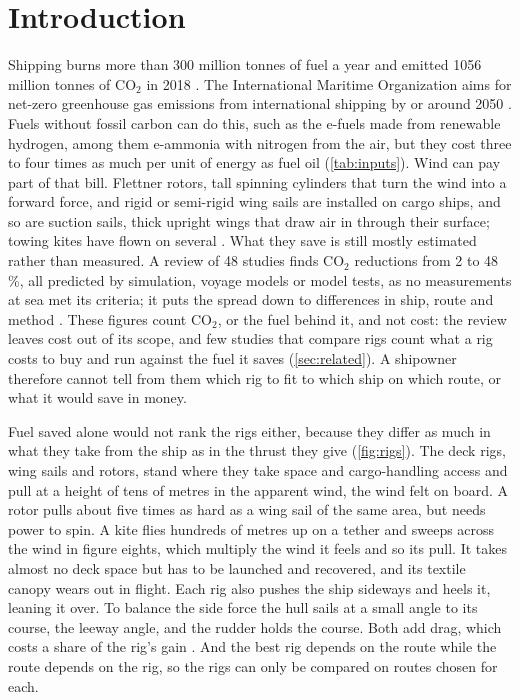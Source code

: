 \section{Introduction}
\label{sec:introduction}

Shipping burns more than 300 million tonnes of fuel a year and emitted \num{1056} million tonnes of CO$_2$ in 2018 \citep{faber2020}. The International Maritime Organization aims for net-zero greenhouse gas emissions from international shipping by or around 2050 \citep{imo2023}. Fuels without fossil carbon can do this, such as the e-fuels made from renewable hydrogen, among them e-ammonia with nitrogen from the air, but they cost three to four times as much per unit of energy as fuel oil (\cref{tab:inputs}). Wind can pay part of that bill. Flettner rotors, tall spinning cylinders that turn the wind into a forward force, and rigid or semi-rigid wing sails are installed on cargo ships, and so are suction sails, thick upright wings that draw air in through their surface; towing kites have flown on several \citep{emsa2023}. What they save is still mostly estimated rather than measured. A review of 48 studies finds CO$_2$ reductions from 2 to 48\,\%, all predicted by simulation, voyage models or model tests, as no measurements at sea met its criteria; it puts the spread down to differences in ship, route and method \citep{huang2025}. These figures count CO$_2$, or the fuel behind it, and not cost: the review leaves cost out of its scope, and few studies that compare rigs count what a rig costs to buy and run against the fuel it saves (\cref{sec:related}). A shipowner therefore cannot tell from them which rig to fit to which ship on which route, or what it would save in money.

Fuel saved alone would not rank the rigs either, because they differ as much in what they take from the ship as in the thrust they give (\cref{fig:rigs}). The deck rigs, wing sails and rotors, stand where they take space and cargo-handling access and pull at a height of tens of metres in the apparent wind, the wind felt on board. A rotor pulls about five times as hard as a wing sail of the same area, but needs power to spin. A kite flies hundreds of metres up on a tether and sweeps across the wind in figure eights, which multiply the wind it feels and so its pull. It takes almost no deck space but has to be launched and recovered, and its textile canopy wears out in flight. Each rig also pushes the ship sideways and heels it, leaning it over. To balance the side force the hull sails at a small angle to its course, the leeway angle, and the rudder holds the course. Both add drag, which costs a share of the rig's gain \citep{kramer2022}. And the best rig depends on the route while the route depends on the rig, so the rigs can only be compared on routes chosen for each.

